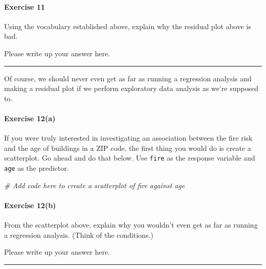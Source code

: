 \documentclass[
]{book}
\newenvironment{Shaded}{\begin{snugshade}}{\end{snugshade}}
\newcommand{\CommentTok}[1]{\textcolor[rgb]{0.56,0.35,0.01}{\textit{#1}}}
\begin{document}
\hypertarget{exercise-11-3}{%
\paragraph*{Exercise 11}\label{exercise-11-3}}

Using the vocabulary established above, explain why the residual plot above is bad.

Please write up your answer here.

\begin{center}\rule{0.5\linewidth}{0.5pt}\end{center}

Of course, we should never even get as far as running a regression analysis and making a residual plot if we perform exploratory data analysis as we're supposed to.

\hypertarget{exercise-12a}{%
\paragraph*{Exercise 12(a)}\label{exercise-12a}}

If you were truly interested in investigating an association between the fire risk and the age of buildings in a ZIP code, the first thing you would do is create a scatterplot. Go ahead and do that below. Use \texttt{fire} as the response variable and \texttt{age} as the predictor.

\begin{Shaded}
\begin{Highlighting}[]
\CommentTok{\# Add code here to create a scatterplot of fire against age}
\end{Highlighting}
\end{Shaded}

\hypertarget{exercise-12b}{%
\paragraph*{Exercise 12(b)}\label{exercise-12b}}

From the scatterplot above, explain why you wouldn't even get as far as running a regression analysis. (Think of the conditions.)

Please write up your answer here.

\begin{center}\rule{0.5\linewidth}{0.5pt}\end{center}
\end{document}

